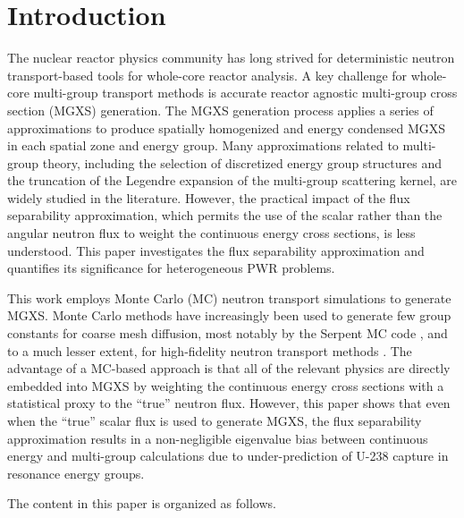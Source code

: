 \section{Introduction}
\label{sec:intro}

The nuclear reactor physics community has long strived for deterministic neutron transport-based tools for whole-core reactor analysis. A key challenge for whole-core multi-group transport methods is accurate reactor agnostic multi-group cross section (MGXS) generation. The MGXS generation process applies a series of approximations to produce spatially homogenized and energy condensed MGXS in each spatial zone and energy group. Many approximations related to multi-group theory, including the selection of discretized energy group structures and the truncation of the Legendre expansion of the multi-group scattering kernel, are widely studied in the literature. However, the practical impact of the flux separability approximation, which permits the use of the scalar rather than the angular neutron flux to weight the continuous energy cross sections, is less understood. This paper investigates the flux separability approximation and quantifies its significance for heterogeneous PWR problems.

This work employs Monte Carlo (MC) neutron transport simulations to generate MGXS. Monte Carlo methods have increasingly been used to generate few group constants for coarse mesh diffusion, most notably by the Serpent MC code \citep{serpent2013manual}, and to a much lesser extent, for high-fidelity neutron transport methods \citep{redmond1997multigroup, nelson2014improved, cai2014condensation, boyd2016thesis}. The advantage of a MC-based approach is that all of the relevant physics are directly embedded into MGXS by weighting the continuous energy cross sections with a statistical proxy to the ``true'' neutron flux. However, this paper shows that even when the ``true'' scalar flux is used to generate MGXS, the flux separability approximation results in a non-negligible eigenvalue bias between continuous energy and multi-group calculations due to under-prediction of U-238 capture in resonance energy groups.

The content in this paper is organized as follows.